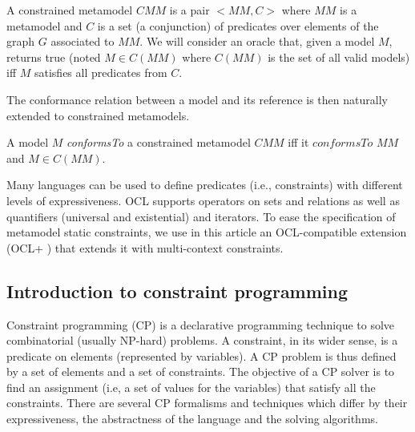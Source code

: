 \documentclass{llncs}
\begin{document}
\begin{definition} A constrained metamodel $CMM$ is a pair $<MM, C>$ where $MM$ is
a metamodel and $C$ is a set (a conjunction) of predicates over elements of the
graph $G$ associated to $MM$. We will consider an oracle that, given a model $M$,
returns true (noted $M \in C(MM)$ where $C(MM)$ is the set of all valid models) iff $M$ satisfies all  predicates from $C$.
\end{definition}
%
The conformance relation between a model and its reference is then naturally extended to constrained metamodels.
%
\begin{definition}\label{def:conformance} A model $M$ \emph{conformsTo} a constrained metamodel $CMM$ iff it $conformsTo$ $MM$ and $M \in C(MM)$.
\end{definition}
Many languages can be used to define predicates (i.e., constraints) with
different levels of expressiveness. OCL supports operators on sets and relations
as well as quantifiers (universal and existential) and iterators. To ease the specification of metamodel static constraints, we use in this article an OCL-compatible extension (OCL+ \cite{ICFG-MM-usecase}) that extends it with multi-context constraints.
%
\subsection{Introduction to constraint programming}
\label{sec:cp}
Constraint programming (CP) is a declarative programming technique to solve
combinatorial (usually NP-hard) problems. A constraint, in its wider sense, is a
predicate on elements (represented by variables). A CP problem is thus defined by
a set of elements and a set of constraints. The objective of a CP solver is to
find an assignment (i.e, a set of values for the variables) that satisfy all the
constraints. There are several CP formalisms and techniques
\cite{DBLP:journals/jlp/JaffarM94} which differ by their expressiveness,
the abstractness of the language and the solving algorithms.
\end{document}
